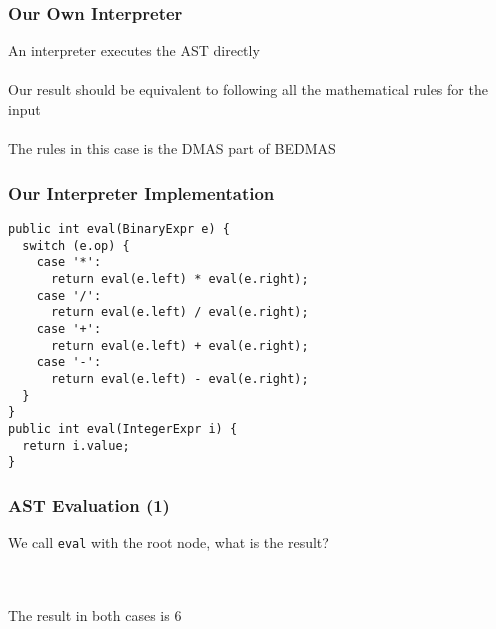 \documentclass[aspectratio=169]{beamer}
\newenvironment{tikztree}[1][3em]{\begin{center}
\begin{tikzpicture}
  \tikzstyle{every node}=[draw=solarizedAccent, circle,
                           minimum size=#1]}{\end{tikzpicture}
\end{center}}
\begin{document}
\begin{frame}
\frametitle{Our Own Interpreter}

An interpreter executes the AST directly\\~\\

Our result should be equivalent to following all the mathematical rules for
the input\\~\\

The rules in this case is the DMAS part of BEDMAS
\end{frame}

\begin{frame}[fragile]
\frametitle{Our Interpreter Implementation}

\begin{lstlisting}[backgroundcolor=\color{solarizedRebase02}]
public int eval(BinaryExpr e) {
  switch (e.op) {
    case '*':
      return eval(e.left) * eval(e.right);
    case '/':
      return eval(e.left) / eval(e.right);
    case '+':
      return eval(e.left) + eval(e.right);
    case '-':
      return eval(e.left) - eval(e.right);
  }
}
public int eval(IntegerExpr i) {
  return i.value;
}
\end{lstlisting}
\end{frame}

\begin{frame}
\frametitle{AST Evaluation (1)}

We call \lstinline{eval} with the root node, what is the result?

~\\~\\
The result in both cases is 6
\end{frame}
\end{document}
